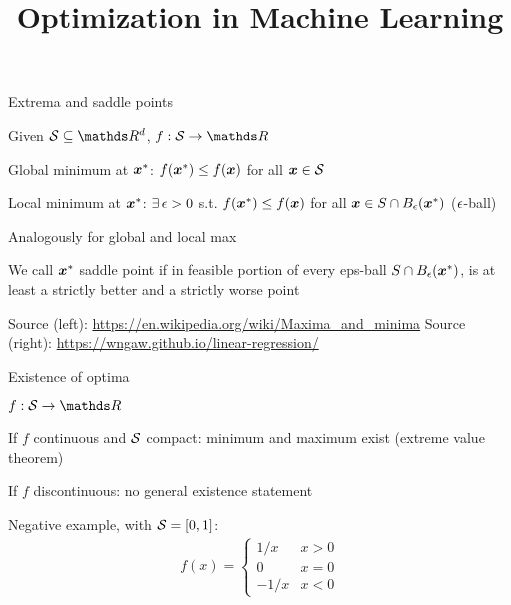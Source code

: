 \documentclass[11pt,compress,t,notes=noshow, xcolor=table]{beamer}
\title{Optimization in Machine Learning}
\begin{document}

\begin{framei}{Extrema and saddle points}
\item Given $\S \subseteq \R^d$, $f: \S \to \R$
\item Global minimum at $\xvs$: $\fxvs \le f(\xv)$ for all $\xv \in \S$
\item Local minimum at $\xvs$: $\exists\, \eps > 0$ s.t. $\fxvs \le f(\xv)$ for all $\xv \in S \cap B_\eps(\xvs)$ ($\eps$-ball)
\item Analogously for global and local max
\item We call $\xvs$ saddle point if in feasible portion of every eps-ball
$S \cap B_\eps(\xvs)$, is at least a strictly better and a strictly worse point
\vfill
{}
\begin{center}\begin{footnotesize}
Source (left): \url{https://en.wikipedia.org/wiki/Maxima_and_minima} \quad Source (right): \url{https://wngaw.github.io/linear-regression/}
\end{footnotesize}\end{center}
\end{framei}



\begin{framei}{Existence of optima}
\item $f: \S \to \R$
\item If $f$ continuous and $\S$ compact: minimum and maximum exist (extreme value theorem)
\item If $f$ discontinuous: no general existence statement
\item Negative example, with $\S = [0,1]$:
\begin{align*}
f(x) = \begin{cases}
1/x  & x > 0 \\
0    & x = 0 \\
-1/x & x < 0
\end{cases}
\end{align*}
\end{framei}
\end{document}
